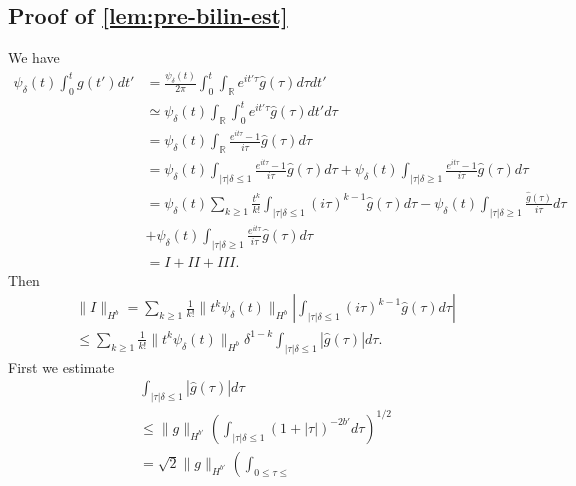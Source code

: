 \documentclass[12pt,reqno]{amsart}
\numberwithin{equation}{section}  %
\newcommand{\rr}{\mathbb{R}}
\newcommand{\wh}{\widehat}
\begin{document}
\begin{appendices}
\subsection{Proof of \cref{lem:pre-bilin-est}}
\label{ssec:pf-pre-bilin-est}
We have
%
%
\begin{equation*}
\begin{split}
  \psi_{\delta}(t) \int_{0}^{t} g(t') dt'
  & = \frac{\psi_{\delta}(t)}{2 \pi} \int_{0}^{t} \int_{\rr} e^{it' \tau}
  \wh{g}(\tau) d \tau dt'
  \\
  & \simeq \psi_{\delta}(t) \int_{\rr} \int_{0}^{t} e^{it' \tau} \wh{g}(\tau) dt' d\tau
  \\
  & = \psi_{\delta}(t)  \int_{\rr} \frac{e^{it \tau} -1}{i \tau}
  \wh{g}(\tau) d \tau
  \\
  & = \psi_{\delta}(t) \int_{| \tau |\delta \le 1} \frac{e^{it\tau}
  -1}{i\tau}\wh{g}(\tau) d \tau + \psi_{\delta}(t) \int_{| \tau |\delta \ge 1} \frac{e^{it\tau}
  -1}{i\tau}\wh{g}(\tau) d \tau
  \\
  & = \psi_{\delta}(t) \sum_{k \ge 1}\frac{t^{k}}{k!} \int_{| \tau |\delta \le 1}
  (i\tau)^{k-1} \wh{g}(\tau) d \tau
  - \psi_{\delta}(t) \int_{| \tau |\delta \ge 1}\frac{\wh{g}(\tau)}{i \tau} d \tau
  \\
  & + \psi_{\delta}(t) \int_{| \tau |\delta \ge 1}
  \frac{e^{it \tau}}{i \tau}\wh{g}(\tau) d \tau
  \\
  & = I + II + III.
\end{split}
\end{equation*}
%
%
Then
%
%
\begin{equation}
  \label{h1-norm}
\begin{split}
  & \|I \|_{H^{b}} = \sum_{k \ge 1} \frac{1}{k!} \| t^{k} \psi_{\delta}(t) \|_{H^{b}}
  | \int_{| \tau |\delta \le 1} (i \tau)^{k-1} \wh{g}(\tau) d \tau |
  \\
  & \le \sum_{k \ge 1} \frac{1}{k!} \|t^{k} \psi_{\delta}(t)\|_{H^{b}} \delta^{1-k}\int_{| \tau |\delta \le
  1} | \wh{g}(\tau) | d \tau.
\end{split}
\end{equation}
%
%
%
%
First we estimate
%
%
\begin{equation*}
  \begin{split}
  & \int_{| \tau |\delta \le 1}| \wh{g}(\tau) | d \tau
  \\
  & \le  \| g \|_{H^{b'}} \left( \int_{| \tau | \delta \le 1}  (1 + | \tau
  |)^{-2b'} d \tau \right)^{1/2} 
  \\
  & = \sqrt{2} \| g \|_{H^{b'}} \left( \int_{0 \le \tau \le
}
\end{split}
\end{equation*}
\end{appendices}
\end{document}
